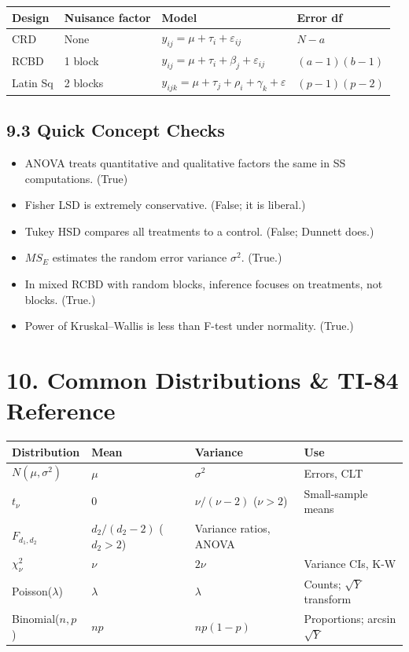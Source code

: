 \documentclass[9pt,letterpaper]{article}
\begin{document}
\begin{center}\small
\begin{tabular}{@{}p{1.7cm}p{2.3cm}p{3.0cm}p{2.3cm}@{}}
\toprule
Design & Nuisance factor & Model & Error df \\
\midrule
CRD & None & $y_{ij}=\mu+\tau_i+\varepsilon_{ij}$ & $N-a$ \\
RCBD & 1 block & $y_{ij}=\mu+\tau_i+\beta_j+\varepsilon_{ij}$ & $(a-1)(b-1)$ \\
Latin Sq & 2 blocks & $y_{ijk}=\mu+\tau_j+\rho_i+\gamma_k+\varepsilon$ & $(p-1)(p-2)$ \\
\bottomrule
\end{tabular}
\end{center}

\subsection{9.3 Quick Concept Checks}

\begin{itemize}
    \item ANOVA treats quantitative and qualitative factors the same in SS computations. (True)
    \item Fisher LSD is extremely conservative. (False; it is liberal.)
    \item Tukey HSD compares all treatments to a control. (False; Dunnett does.)
    \item $MS_E$ estimates the random error variance $\sigma^2$. (True.)
    \item In mixed RCBD with random blocks, inference focuses on treatments, not blocks. (True.)
    \item Power of Kruskal--Wallis is less than F-test under normality. (True.)
\end{itemize}

\section{10. Common Distributions \& TI-84 Reference}

\begin{center}\small
\begin{tabular}{@{}llll@{}}
\toprule
Distribution & Mean & Variance & Use \\
\midrule
$N(\mu,\sigma^2)$ & $\mu$ & $\sigma^2$ & Errors, CLT \\
$t_\nu$ & 0 & $\nu/(\nu-2)$ ($\nu>2$) & Small-sample means \\
$F_{d_1,d_2}$ & $d_2/(d_2-2)$ ($d_2>2$) & Variance ratios, ANOVA \\
$\chi^2_\nu$ & $\nu$ & $2\nu$ & Variance CIs, K-W \\
Poisson($\lambda$) & $\lambda$ & $\lambda$ & Counts; \(\sqrt{Y}\) transform \\
Binomial($n,p$) & $np$ & $np(1-p)$ & Proportions; arcsin$\sqrt{Y}$ \\
\bottomrule
\end{tabular}
\end{center}
\end{document}
